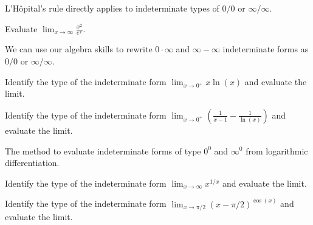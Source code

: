 \documentclass[../main.tex]{subfiles}
\begin{document}
  L'H\^opital's rule directly applies to indeterminate types of \(0/0\) or \(\infty/\infty\).
  \begin{example}
    Evaluate \(\lim_{x \to \infty} \frac{x^{2}}{e^{x}}\).
  \end{example}

  
  \clearpage

  We can use our algebra skills to rewrite \(0 \cdot \infty\) and \(\infty - \infty\) indeterminate forms as \(0/0\) or \(\infty/\infty\).
  \begin{example}
    Identify the type of the indeterminate form  \(\lim_{x \to 0^{+}} x \ln(x)\) and evaluate the limit.
  \end{example}

  \begin{example}
    Identify the type of the indeterminate form  \(\lim_{x \to 0^{+}} \left(\frac{1}{x-1} - \frac{1}{\ln(x)}\right)\) and evaluate the limit.
  \end{example}

  The method to evaluate indeterminate forms of type \(0^{0}\) and \(\infty^{0}\)  from logarithmic differentiation.
  \begin{example}
    Identify the type of the indeterminate form \(\lim_{x \to \infty} x^{1/x}\) and evaluate the limit.
  \end{example}
  \clearpage

  \begin{example}
      Identify the type of the indeterminate form \(\lim_{x \to \pi/2} (x - \pi/2)^{\cos(x)}\) and evaluate the limit.
  \end{example}
\end{document}
